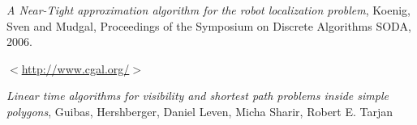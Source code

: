 \documentclass[a4paper,10pt]{article}
\begin{document}
\newpage

\begin{thebibliography}{1}
 \emph{A Near-Tight approximation algorithm for the robot localization problem},
 Koenig, Sven and Mudgal, Proceedings of the Symposium on Discrete Algorithms SODA, 2006.

 $<$\url{http://www.cgal.org/}$>$

 \emph{Linear time algorithms for visibility and shortest path problems inside simple polygons}, Guibas, 
Hershberger, Daniel Leven, Micha Sharir, Robert E. Tarjan
\end{thebibliography}
\end{document}
